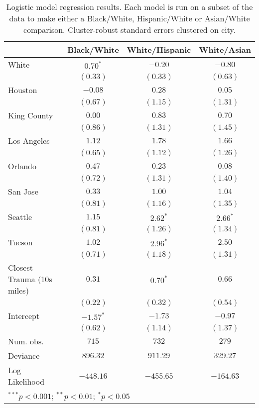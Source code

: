 
\begin{table}[ht!]
\begin{center}
\begin{tabular}{l c c c}
\toprule
 & Black/White & White/Hispanic & White/Asian \\
\midrule
White                      & $0.70^{*}$  & $-0.20$    & $-0.80$    \\
                           & $(0.33)$    & $(0.33)$   & $(0.63)$   \\
Houston                    & $-0.08$     & $0.28$     & $0.05$     \\
                           & $(0.67)$    & $(1.15)$   & $(1.31)$   \\
King County                & $0.00$      & $0.83$     & $0.70$     \\
                           & $(0.86)$    & $(1.31)$   & $(1.45)$   \\
Los Angeles                & $1.12$      & $1.78$     & $1.66$     \\
                           & $(0.65)$    & $(1.12)$   & $(1.26)$   \\
Orlando                    & $0.47$      & $0.23$     & $0.08$     \\
                           & $(0.72)$    & $(1.31)$   & $(1.40)$   \\
San Jose                   & $0.33$      & $1.00$     & $1.04$     \\
                           & $(0.81)$    & $(1.16)$   & $(1.35)$   \\
Seattle                    & $1.15$      & $2.62^{*}$ & $2.66^{*}$ \\
                           & $(0.81)$    & $(1.26)$   & $(1.34)$   \\
Tucson                     & $1.02$      & $2.96^{*}$ & $2.50$     \\
                           & $(0.71)$    & $(1.18)$   & $(1.31)$   \\
Closest Trauma (10s miles) & $0.31$      & $0.70^{*}$ & $0.66$     \\
                           & $(0.22)$    & $(0.32)$   & $(0.54)$   \\
Intercept                  & $-1.57^{*}$ & $-1.73$    & $-0.97$    \\
                           & $(0.62)$    & $(1.14)$   & $(1.37)$   \\
\midrule
Num. obs.                  & $715$       & $732$      & $279$      \\
Deviance                   & $896.32$    & $911.29$   & $329.27$   \\
Log Likelihood             & $-448.16$   & $-455.65$  & $-164.63$  \\
\bottomrule
\multicolumn{4}{l}{\scriptsize{$^{***}p<0.001$; $^{**}p<0.01$; $^{*}p<0.05$}}
\end{tabular}
\caption{Logistic model regression results. Each model is run on a subset of the data to make either a Black/White, Hispanic/White or Asian/White comparison. Cluster-robust standard errors clustered on city.}
\label{table:regression_all_comparisons_logit}
\end{center}
\end{table}
